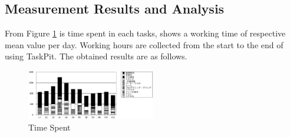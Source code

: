 \documentclass [paper]{ieice}
\begin{document}
\subsection{Measurement Results and Analysis}
	From Figure \ref{fig9} is time spent in each tasks, shows a working time of respective mean value per day. Working hours are collected from the start to the end of using TaskPit. The obtained results are as follows.\par
	
\begin{figure}[h]
	\centering	
\includegraphics[width=0.5\textwidth]{fig9}
	\caption{Time Spent}
	\label{fig9}
\end{figure}
\end{document}
